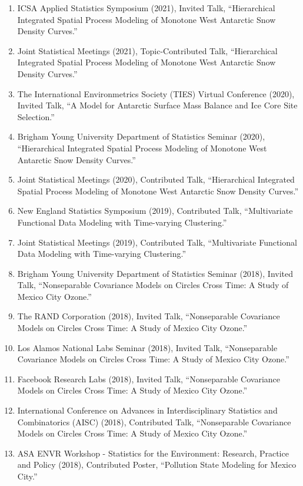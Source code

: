\documentclass[11pt]{article}
\begin{document}
\begin{enumerate}[label=$\bullet$]

\item ICSA Applied Statistics Symposium (2021), Invited Talk, ``Hierarchical Integrated Spatial Process Modeling of Monotone West Antarctic Snow Density Curves.''
\item Joint Statistical Meetings (2021), Topic-Contributed Talk, ``Hierarchical Integrated Spatial Process Modeling of Monotone West Antarctic Snow Density Curves.''

\item The International Environmetrics Society (TIES) Virtual Conference (2020), Invited Talk, ``A Model for Antarctic Surface Mass Balance and Ice Core Site Selection.''
\item Brigham Young University Department of Statistics Seminar (2020), ``Hierarchical Integrated Spatial Process Modeling of Monotone West Antarctic Snow Density Curves.''
\item Joint Statistical Meetings (2020), Contributed Talk, ``Hierarchical Integrated Spatial Process Modeling of Monotone West Antarctic Snow Density Curves.''

\item New England Statistics Symposium (2019), Contributed Talk, ``Multivariate Functional Data Modeling with Time-varying Clustering.''
\item Joint Statistical Meetings (2019), Contributed Talk, ``Multivariate Functional Data Modeling with Time-varying Clustering.''

\item Brigham Young University Department of Statistics Seminar (2018), Invited Talk, ``Nonseparable Covariance Models on Circles Cross Time: A Study of Mexico City Ozone.''
\item The RAND Corporation (2018), Invited Talk, ``Nonseparable Covariance Models on Circles Cross Time: A Study of Mexico City Ozone.''
\item Los Alamos National Labs Seminar (2018), Invited Talk, ``Nonseparable Covariance Models on Circles Cross Time: A Study of Mexico City Ozone.''
\item Facebook Research Labs (2018), Invited Talk, ``Nonseparable Covariance Models on Circles Cross Time: A Study of Mexico City Ozone.''
\item International Conference on Advances in Interdisciplinary Statistics and Combinatorics (AISC) (2018), Contributed Talk, ``Nonseparable Covariance Models on Circles Cross Time: A Study of Mexico City Ozone.''
\item ASA ENVR Workshop - Statistics for the Environment: Research, Practice and Policy (2018), Contributed Poster, ``Pollution State Modeling for Mexico City.''


\end{enumerate}
\end{document}
